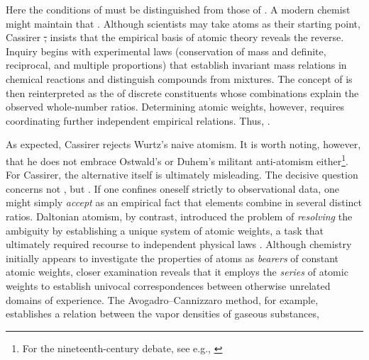 \documentclass[submitted,12pt]{article}
\providecommand{\DIFdel}[1]{{\protect\color{red}\sout{#1}}}                      %
\providecommand{\DIFdelbegin}{} %
\providecommand{\DIFdelend}{} %
\begin{document}
Here the conditions of  must be distinguished from those of  . A modern chemist might maintain that  . Although scientists may take atoms as their starting point, Cassirer \DIFdelbegin \DIFdel{, }\DIFdelend insists that the empirical basis of atomic theory reveals the reverse. Inquiry begins with experimental laws (conservation of mass and definite, reciprocal, and multiple proportions) that establish invariant mass relations in chemical reactions and distinguish compounds from mixtures. The concept of  is then reinterpreted as the  of discrete constituents whose combinations explain the observed whole-number ratios. Determining atomic weights, however, requires coordinating further independent empirical relations. Thus,  .

As expected, Cassirer rejects Wurtz's naive atomism. It is worth noting, however, that he does not embrace Ostwald's or Duhem's militant anti-atomism either\footnote{For the nineteenth-century debate, see e.g., \citet{Rocke1984}}. For Cassirer, the alternative itself is ultimately misleading. The decisive question concerns not , but  . If one confines oneself strictly to observational data, one might simply \emph{accept} as an empirical fact that elements combine in several distinct ratios. Daltonian atomism, by contrast, introduced the problem of \emph{resolving} the ambiguity by establishing a unique system of atomic weights, a task that ultimately required recourse to independent physical laws \cite[see][lect.~IV]{Ladenburg1902}. Although chemistry initially appears to investigate the properties of atoms as \emph{bearers} of constant atomic weights, closer examination reveals that it employs the \emph{series} of atomic weights to establish univocal correspondences between otherwise unrelated domains of experience. The Avogadro--Cannizzaro method, for example, establishes a relation between the vapor densities of gaseous substances,
\end{document}
